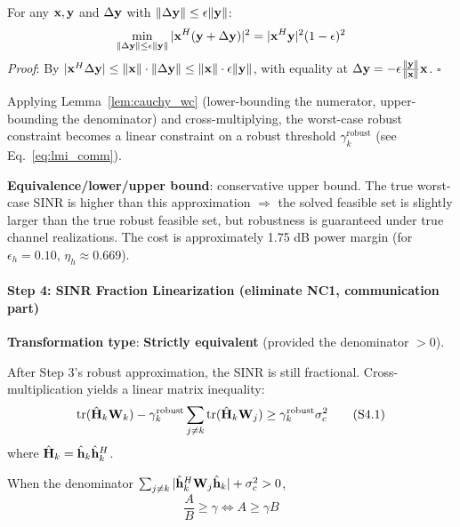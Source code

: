 \begin{lemma}\label{lem:cauchy_wc}
For any $\mathbf{x}, \mathbf{y}$ and $\Delta\mathbf{y}$ with $\|\Delta\mathbf{y}\| \leq \epsilon\|\mathbf{y}\|$:
\begin{equation}
\min_{\|\Delta\mathbf{y}\|\leq\epsilon\|\mathbf{y}\|} |\mathbf{x}^H(\mathbf{y}+\Delta\mathbf{y})|^2 = |\mathbf{x}^H\mathbf{y}|^2 (1-\epsilon)^2
\end{equation}
\textit{Proof}: By $| \mathbf{x}^H \Delta\mathbf{y}| \leq \|\mathbf{x}\| \cdot \|\Delta\mathbf{y}\| \leq \|\mathbf{x}\| \cdot \epsilon\|\mathbf{y}\|$, with equality at $\Delta\mathbf{y} = -\epsilon \frac{\|\mathbf{y}\|}{\|\mathbf{x}\|} \mathbf{x}$. $\square$
\end{lemma}

Applying Lemma~\ref{lem:cauchy_wc} (lower-bounding the numerator, upper-bounding the denominator) and cross-multiplying, the worst-case robust constraint becomes a linear constraint on a robust threshold $\gamma_k^{\text{robust}}$ (see Eq.~\eqref{eq:lmi_comm}).

\textbf{Equivalence/lower/upper bound}: conservative upper bound. The true worst-case SINR is higher than this approximation $\Rightarrow$ the solved feasible set is slightly larger than the true robust feasible set, but robustness is guaranteed under true channel realizations. The cost is approximately 1.75 dB power margin (for $\epsilon_h=0.10$, $\eta_h \approx 0.669$).

\paragraph{Step 4: SINR Fraction Linearization (eliminate NC1, communication part)}
\textbf{Transformation type}: \textbf{Strictly equivalent} (provided the denominator $> 0$).

After Step 3's robust approximation, the SINR is still fractional. Cross-multiplication yields a linear matrix inequality:
\begin{equation}
\text{tr}(\hat{\mathbf{H}}_k \mathbf{W}_k) - \gamma_k^{\text{robust}} \sum_{j\neq k} \text{tr}(\hat{\mathbf{H}}_k \mathbf{W}_j) \geq \gamma_k^{\text{robust}} \sigma_c^2 \tag{S4.1}
\end{equation}
where $\hat{\mathbf{H}}_k = \hat{\mathbf{h}}_k \hat{\mathbf{h}}_k^H$.

\begin{proposition}\label{prop:frac}
When the denominator $\sum_{j\neq k}|\hat{\mathbf{h}}_k^H \mathbf{W}_j \hat{\mathbf{h}}_k| + \sigma_c^2 > 0$,
\begin{equation}
\frac{A}{B} \geq \gamma \iff A \geq \gamma B
\end{equation}
\end{proposition}

